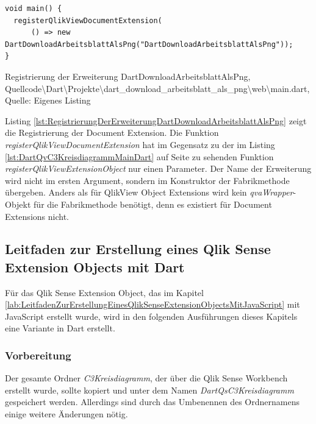\begin{listing}[htbp]
\begin{verbatim}
void main() {  
  registerQlikViewDocumentExtension(
      () => new DartDownloadArbeitsblattAlsPng("DartDownloadArbeitsblattAlsPng"));
}
\end{verbatim}
\caption[Registrierung der Erweiterung DartDownloadArbeitsblattAlsPng]{Registrierung der Erweiterung DartDownloadArbeitsblattAlsPng, \\Quellcode\textbackslash{}Dart\textbackslash{}Projekte\textbackslash{}dart\_download\_arbeitsblatt\_als\_png\textbackslash{}web\textbackslash{}main.dart, \\Quelle: Eigenes Listing}
\label{lst:RegistrierungDerErweiterungDartDownloadArbeitsblattAlsPng}
\end{listing}

Listing \ref{lst:RegistrierungDerErweiterungDartDownloadArbeitsblattAlsPng} zeigt die Registrierung der Document Extension. Die Funktion \textit{register\-QlikView\-Document\-Extension} hat im Gegensatz zu der im Listing \ref{lst:DartQvC3KreisdiagrammMainDart} auf Seite \pageref{lst:DartQvC3KreisdiagrammMainDart} zu sehenden Funktion \textit{register\-QlikView\-Extension\-Object} nur einen Parameter. Der Name der Erweiterung wird nicht im ersten Argument, sondern im Konstruktor der Fabrikmethode übergeben. Anders als für QlikView Object Extensions wird kein \textit{qvaWrapper}-Objekt für die Fabrikmethode benötigt, denn es existiert für Document Extensions nicht.


\subsection{Leitfaden zur Erstellung eines Qlik Sense Extension Objects mit Dart}

Für das Qlik Sense Extension Object, das im Kapitel \ref{lab:LeitfadenZurErstellungEinesQlikSenseExtensionObjectsMitJavaScript} mit JavaScript erstellt wurde, wird in den folgenden Ausführungen dieses Kapitels eine Variante in Dart erstellt.

\subsubsection{Vorbereitung}

Der gesamte Ordner \textit{C3Kreisdiagramm}, der über die Qlik Sense Workbench erstellt wurde, sollte kopiert und unter dem Namen \textit{Dart\-Qs\-C3\-Kreis\-diagramm} gespeichert werden. Allerdings sind durch das Umbenennen des Ordnernamens einige weitere Änderungen nötig.

